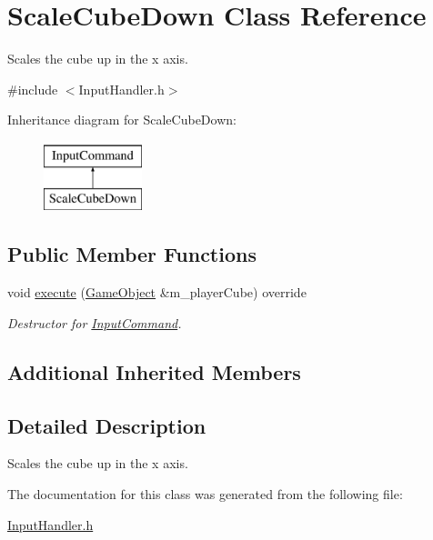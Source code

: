 \hypertarget{class_scale_cube_down}{}\section{Scale\+Cube\+Down Class Reference}
\label{class_scale_cube_down}


Scales the cube up in the x axis.  




{\ttfamily \#include $<$Input\+Handler.\+h$>$}

Inheritance diagram for Scale\+Cube\+Down\+:\begin{figure}[H]
\begin{center}
\leavevmode
\includegraphics[height=2.000000cm]{class_scale_cube_down}
\end{center}
\end{figure}
\subsection*{Public Member Functions}
\begin{DoxyCompactItemize}
\item 
\mbox{\label{class_scale_cube_down_a5815f263381cc15310856c2de70017f2}} 
void \mbox{\hyperlink{class_scale_cube_down_a5815f263381cc15310856c2de70017f2}{execute}} (\mbox{\hyperlink{class_game_object}{Game\+Object}} \&m\+\_\+player\+Cube) override
\begin{DoxyCompactList}\small\item\em Destructor for \mbox{\hyperlink{class_input_command}{Input\+Command}}. \end{DoxyCompactList}\end{DoxyCompactItemize}
\subsection*{Additional Inherited Members}


\subsection{Detailed Description}
Scales the cube up in the x axis. 

The documentation for this class was generated from the following file\+:\begin{DoxyCompactItemize}
\item 
\mbox{\hyperlink{_input_handler_8h}{Input\+Handler.\+h}}\end{DoxyCompactItemize}
